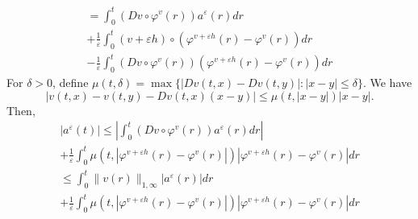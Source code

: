 \documentclass[a5paper,10pt,twoside]{article}
\theoremstyle{plain}
\theoremstyle{definition}
\theoremstyle{remark}
\begin{document}
\begin{multline*}
=\int_0^t\left(Dv\circ \varphi^v(r)\right)a^\varepsilon(r)dr\\+\frac{1}{\varepsilon}\int_0^t (v+\varepsilon h)\circ\left(\varphi^{v+\varepsilon h}(r)-\varphi^v(r)\right)dr \\-\frac{1}{\varepsilon}\int_0^t\left(Dv\circ \varphi^v(r)\right)\left(\varphi^{v+\varepsilon h}(r)-\varphi^v(r)\right)dr
\end{multline*}
For $\delta>0$, define $\mu(t,\delta)=\max\{|Dv(t,x)-Dv(t,y)|: |x-y|\leq \delta\}.$ We have
\[
|v(t,x)-v(t,y)-Dv(t,x)(x-y)|\leq \mu(t,|x-y|)|x-y|.
\]
Then,
%
\begin{multline*}
|a^\varepsilon(t)|\leq \left|\int_0^t\left(Dv\circ \varphi^v(r)\right)a^\varepsilon(r)dr\right|\\+\frac{1}{\varepsilon}\int_0^t \mu(t,|\varphi^{v+\varepsilon h}(r)-\varphi^v(r)|)\left|\varphi^{v+\varepsilon h}(r)-\varphi^v(r)\right|dr 
\end{multline*}
\begin{multline*}
\leq \int_0^t\|v(r)\|_{1,\infty}|a^\varepsilon(r)|dr\\+\frac{1}{\varepsilon}\int_0^t \mu(t,|\varphi^{v+\varepsilon h}(r)-\varphi^v(r)|)\left|\varphi^{v+\varepsilon h}(r)-\varphi^v(r)\right|dr 
\end{multline*}
\end{document}
